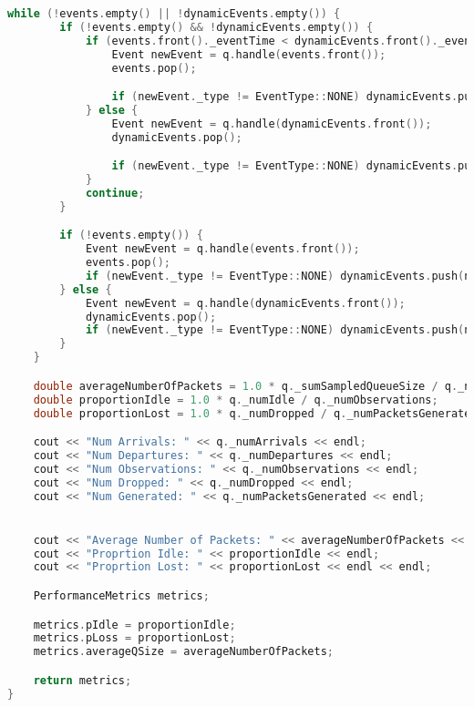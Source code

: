 \documentclass{article}
\begin{document}
\begin{lstlisting}[language=C++,
                   directivestyle={\color{black}}
                   emph={int,char,double,float,unsigned},
                   emphstyle={\color{blue}}
                  ]
    while (!events.empty() || !dynamicEvents.empty()) {
        if (!events.empty() && !dynamicEvents.empty()) {
            if (events.front()._eventTime < dynamicEvents.front()._eventTime) {
                Event newEvent = q.handle(events.front());
                events.pop();

                if (newEvent._type != EventType::NONE) dynamicEvents.push(newEvent);
            } else {
                Event newEvent = q.handle(dynamicEvents.front());
                dynamicEvents.pop();

                if (newEvent._type != EventType::NONE) dynamicEvents.push(newEvent);
            }
            continue;
        }

        if (!events.empty()) {
            Event newEvent = q.handle(events.front());
            events.pop();
            if (newEvent._type != EventType::NONE) dynamicEvents.push(newEvent);
        } else {
            Event newEvent = q.handle(dynamicEvents.front());
            dynamicEvents.pop();
            if (newEvent._type != EventType::NONE) dynamicEvents.push(newEvent);
        }
    }

    double averageNumberOfPackets = 1.0 * q._sumSampledQueueSize / q._numObservations;
    double proportionIdle = 1.0 * q._numIdle / q._numObservations;
    double proportionLost = 1.0 * q._numDropped / q._numPacketsGenerated;

    cout << "Num Arrivals: " << q._numArrivals << endl;
    cout << "Num Departures: " << q._numDepartures << endl;
    cout << "Num Observations: " << q._numObservations << endl;
    cout << "Num Dropped: " << q._numDropped << endl;
    cout << "Num Generated: " << q._numPacketsGenerated << endl;


    cout << "Average Number of Packets: " << averageNumberOfPackets << endl;
    cout << "Proprtion Idle: " << proportionIdle << endl;
    cout << "Proprtion Lost: " << proportionLost << endl << endl;

    PerformanceMetrics metrics;

    metrics.pIdle = proportionIdle;
    metrics.pLoss = proportionLost;
    metrics.averageQSize = averageNumberOfPackets;

    return metrics;
}
\end{lstlisting}

\newpage
\end{document}

